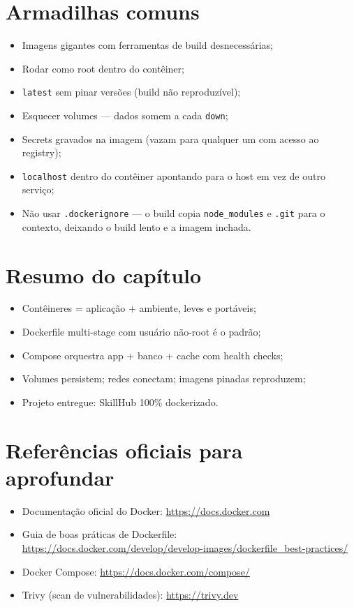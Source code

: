 \section{Armadilhas comuns}

\begin{itemize}[leftmargin=*, itemsep=0.4em]
  \item Imagens gigantes com ferramentas de build desnecessárias;
  \item Rodar como root dentro do contêiner;
  \item \texttt{latest} sem pinar versões (build não reproduzível);
  \item Esquecer volumes — dados somem a cada \texttt{down};
  \item Secrets gravados na imagem (vazam para qualquer um com acesso ao registry);
  \item \texttt{localhost} dentro do contêiner apontando para o host em vez de outro serviço;
  \item Não usar \texttt{.dockerignore} — o build copia \texttt{node\_modules}
  e \texttt{.git} para o contexto, deixando o build lento e a imagem inchada.
\end{itemize}

\section{Resumo do capítulo}

\begin{itemize}[leftmargin=*, itemsep=0.3em]
  \item Contêineres = aplicação + ambiente, leves e portáveis;
  \item Dockerfile multi-stage com usuário não-root é o padrão;
  \item Compose orquestra app + banco + cache com health checks;
  \item Volumes persistem; redes conectam; imagens pinadas reproduzem;
  \item Projeto entregue: SkillHub 100\% dockerizado.
\end{itemize}

\section{Referências oficiais para aprofundar}

\begin{itemize}[leftmargin=*, itemsep=0.3em]
  \item Documentação oficial do Docker: \url{https://docs.docker.com}
  \item Guia de boas práticas de Dockerfile: \url{https://docs.docker.com/develop/develop-images/dockerfile_best-practices/}
  \item Docker Compose: \url{https://docs.docker.com/compose/}
  \item Trivy (scan de vulnerabilidades): \url{https://trivy.dev}
\end{itemize}
